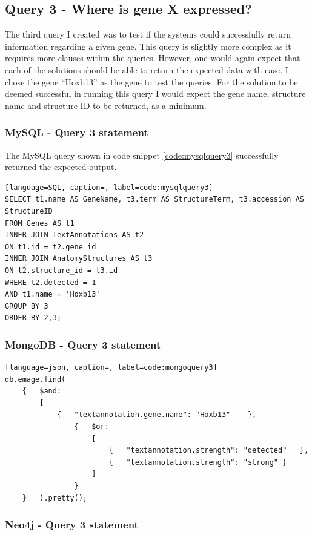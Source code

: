 \subsection*{Query 3 - Where is gene X expressed?}\label{query3}
The third query I created was to test if the systems could successfully return information regarding a given gene. This query is slightly more complex as it requires more clauses within the queries. However, one would again expect that each of the solutions should be able to return the expected data with ease. I chose the gene ``Hoxb13'' as the gene to test the queries. For the solution to be deemed successful in running this query I would expect the gene name, structure name and structure ID to be returned, as a minimum.

\subsubsection*{MySQL - Query 3 statement}\label{mysqlquery3statement}
The MySQL query shown in code snippet \ref{code:mysqlquery3} successfully returned the expected output. 

\begin{lstlisting}[language=SQL, caption=, label=code:mysqlquery3]
SELECT t1.name AS GeneName, t3.term AS StructureTerm, t3.accession AS StructureID
FROM Genes AS t1
INNER JOIN TextAnnotations AS t2
ON t1.id = t2.gene_id
INNER JOIN AnatomyStructures AS t3
ON t2.structure_id = t3.id
WHERE t2.detected = 1
AND t1.name = 'Hoxb13'
GROUP BY 3
ORDER BY 2,3;
\end{lstlisting}

\subsubsection*{MongoDB - Query 3 statement}\label{mongoquery3statement}

\begin{lstlisting}[language=json, caption=, label=code:mongoquery3]
db.emage.find(
	{	$and:
		[
			{	"textannotation.gene.name": "Hoxb13"	},
				{	$or:
					[
						{	"textannotation.strength": "detected"	},
						{	"textannotation.strength": "strong"	}
					]
				}
	}	).pretty();
\end{lstlisting}

\subsubsection*{Neo4j - Query 3 statement}\label{neoquery3statement}

